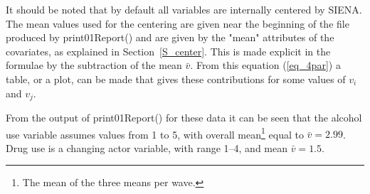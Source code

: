 \documentclass[a4paper,fleqn,11pt]{article}
\newcommand{\+}{\, + \,}
\newcommand{\sfn}[1]{\textsf{#1}}
\newcommand{\si}{{\sf SIENA}}
\begin{document}

It should be noted that by default all variables are internally centered by \si.
The mean values used for the centering
are given near the beginning of the file produced by
\sfn{print01Report()} and are given by the \textsf{"mean"}
attributes of the covariates, as explained in
Section~\ref{S_center}.
This is made explicit in the formulae by the subtraction
of the mean $\bar v$.
From this equation (\ref{eq_4par}) a table, or a plot, can be made
that gives these contributions for some values of $v_i$ and $v_j$.

From the output of \sfn{print01Report()} for these data it can be seen that
the alcohol use variable assumes values from 1 to 5, with overall
mean\footnote{The mean of the three means per wave.}
equal to $\bar v = 2.99$.
Drug use is a changing actor variable, with
range 1--4, and mean $\bar v = 1.5$.
\end{document}
